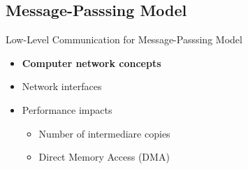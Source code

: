 	\subsection{Message-Passsing Model}

		\begin{frame}[fragile]{Low-Level Communication for Message-Passsing Model}
			\begin{itemize}
				\item \textbf{Computer network concepts}
				\item Network interfaces
				\item Performance impacts
				\begin{itemize}
					\item Number of intermediare copies
					\item Direct Memory Access (DMA)
				\end{itemize}
			\end{itemize}

		\end{frame}

